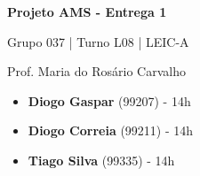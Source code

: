 \documentclass[12pt,a4paper]{article}
\begin{document}
\begin{titlepage}
  \begin{center}
    \vspace*{5cm}

    \Huge
    \textbf{Projeto AMS - Entrega 1}

    \vspace{0.5cm}
    \LARGE
    Grupo 037 | Turno L08 | LEIC-A

    \vspace{0.5cm}
    \large
    Prof. Maria do Rosário Carvalho

    \vfill
  \end{center}
  \large
  \begin{itemize}
    \item[] \textbf{Diogo Gaspar} (99207) - 14h
    \item[] \textbf{Diogo Correia} (99211) - 14h
    \item[] \textbf{Tiago Silva} (99335) - 14h
  \end{itemize}
\end{titlepage}
\end{document}
